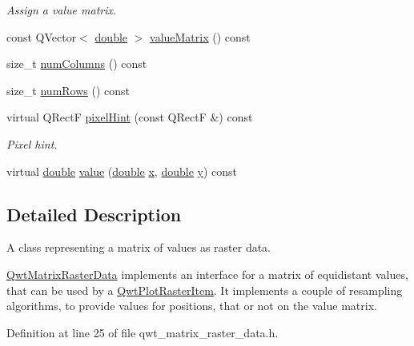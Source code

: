 \begin{DoxyCompactItemize}
\begin{DoxyCompactList}\small\item\em Assign a value matrix. \end{DoxyCompactList}\item 
const Q\-Vector$<$ \hyperlink{_super_l_u_support_8h_a8956b2b9f49bf918deed98379d159ca7}{double} $>$ \hyperlink{class_qwt_matrix_raster_data_a001d575e77cf90c29ec8c5a6f8656946}{value\-Matrix} () const 
\item 
size\-\_\-t \hyperlink{class_qwt_matrix_raster_data_ab9554c0c132f8a5a7ce6bc2baea37b14}{num\-Columns} () const 
\item 
size\-\_\-t \hyperlink{class_qwt_matrix_raster_data_ace0953054ec4ea6f4861e68cb9023ccd}{num\-Rows} () const 
\item 
virtual Q\-Rect\-F \hyperlink{class_qwt_matrix_raster_data_a7a9034de8037af500e4f737f54591358}{pixel\-Hint} (const Q\-Rect\-F \&) const 
\begin{DoxyCompactList}\small\item\em Pixel hint. \end{DoxyCompactList}\item 
virtual \hyperlink{_super_l_u_support_8h_a8956b2b9f49bf918deed98379d159ca7}{double} \hyperlink{class_qwt_matrix_raster_data_a49952670063166bccdbfb9cdbd7b56e8}{value} (\hyperlink{_super_l_u_support_8h_a8956b2b9f49bf918deed98379d159ca7}{double} \hyperlink{glext_8h_a1db9d104e3c2128177f26aff7b46982f}{x}, \hyperlink{_super_l_u_support_8h_a8956b2b9f49bf918deed98379d159ca7}{double} \hyperlink{glext_8h_a42315f3ed8fff752bb47fd782309fcfc}{y}) const 
\end{DoxyCompactItemize}


\subsection{Detailed Description}
A class representing a matrix of values as raster data. 

\hyperlink{class_qwt_matrix_raster_data}{Qwt\-Matrix\-Raster\-Data} implements an interface for a matrix of equidistant values, that can be used by a \hyperlink{class_qwt_plot_raster_item}{Qwt\-Plot\-Raster\-Item}. It implements a couple of resampling algorithms, to provide values for positions, that or not on the value matrix. 

Definition at line 25 of file qwt\-\_\-matrix\-\_\-raster\-\_\-data.\-h.




